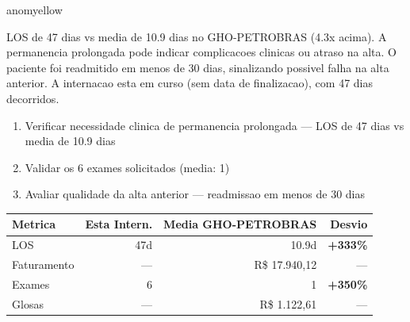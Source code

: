 \documentclass[a4paper,10pt]{article}
\begin{document}
\begin{anomalycard}[Internacao 164361 | GHO-PETROBRAS | MODERADO (z=2.34)]{anomyellow}
\vspace{2pt}\begin{tcolorbox}[colback=severityred!20,colframe=anomyellow,title={\textbf{Interpretacao de Negocio}},fonttitle=\bfseries\small,left=4pt,right=4pt,top=3pt,bottom=3pt]
{\small LOS de 47 dias vs media de 10.9 dias no GHO-PETROBRAS (4.3x acima). A permanencia prolongada pode indicar complicacoes clinicas ou atraso na alta. O paciente foi readmitido em menos de 30 dias, sinalizando possivel falha na alta anterior. A internacao esta em curso (sem data de finalizacao), com 47 dias decorridos.}
\end{tcolorbox}
\begin{tcolorbox}[colback=severityyellow!30,colframe=anomorange,title={\textbf{Recomendacoes Especificas}},fonttitle=\bfseries\small,left=4pt,right=4pt,top=3pt,bottom=3pt]
\begin{enumerate}[nosep,leftmargin=16pt]
\item {\small Verificar necessidade clinica de permanencia prolongada --- LOS de 47 dias vs media de 10.9 dias}
\item {\small Validar os 6 exames solicitados (media: 1)}
\item {\small Avaliar qualidade da alta anterior --- readmissao em menos de 30 dias}
\end{enumerate}
\end{tcolorbox}
\begin{center}\begin{tabular}{l r r r}\toprule\textbf{Metrica} & \textbf{Esta Intern.} & \textbf{Media GHO-PETROBRAS} & \textbf{Desvio} \\\midrule
LOS & 47d & 10.9d & \textcolor{anomred}{\textbf{+333\%}} \\
Faturamento & --- & R\$ 17.940,12 & --- \\
Exames & 6 & 1 & \textcolor{anomred}{\textbf{+350\%}} \\
Glosas & --- & R\$ 1.122,61 & --- \\
\bottomrule\end{tabular}\end{center}


\end{anomalycard}
\end{document}
